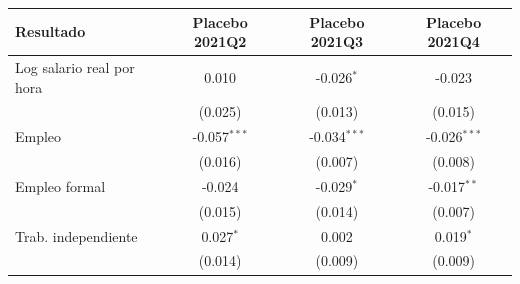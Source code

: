 \begin{tabular}{lccc}
\toprule
Resultado & Placebo 2021Q2 & Placebo 2021Q3 & Placebo 2021Q4 \\
\midrule
Log salario real por hora & 0.010 & -0.026$^{*}$ & -0.023 \\
 & (0.025) & (0.013) & (0.015) \\
Empleo & -0.057$^{***}$ & -0.034$^{***}$ & -0.026$^{***}$ \\
 & (0.016) & (0.007) & (0.008) \\
Empleo formal & -0.024 & -0.029$^{*}$ & -0.017$^{**}$ \\
 & (0.015) & (0.014) & (0.007) \\
Trab. independiente & 0.027$^{*}$ & 0.002 & 0.019$^{*}$ \\
 & (0.014) & (0.009) & (0.009) \\
\bottomrule
\end{tabular}
